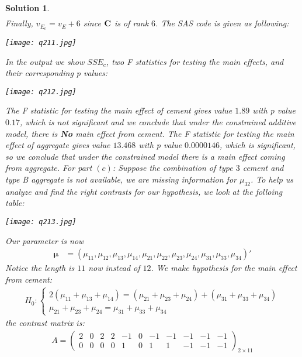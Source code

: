 \documentclass[11pt]{article}
\newtheorem{sol}{Solution}
\begin{document}
\begin{sol}
\begin{align*}
	\end{align*}
	Finally, $v_{E_c} = v_E + 6$ since ${\bf C}$ is of rank $6$.\vskip 2mm
	The SAS code is given as following:
	\begin{center}
		\texttt{[image: q211.jpg]}
	\end{center}
	In the output we show $SSE_c$, two F statistics for testing the main effects, and their corresponding p values:
	\begin{center}
		\texttt{[image: q212.jpg]}
	\end{center}
	The F statistic for testing the main effect of cement gives value $1.89$ with p value $0.17$, which is not significant and we conclude that under the constrained additive model, there is {\bf No} main effect from cement. The F statistic for testing the main effect of aggregate gives value $13.468 $ with p value $0.0000146$, which is significant, so we conclude that under the constrained model there is a main effect coming from aggregate.\vskip 2mm
	For part $(c)$:\vskip 2mm
	Suppose the combination of type $3$ cement and type B aggregate is not available, we are missing information for $\mu_{32}$. To help us analyze and find the right contrasts for our hypothesis, we look at the folloing table:
	\begin{center}
		\texttt{[image: q213.jpg]}
	\end{center}
	Our parameter is now
	\begin{align*}
		{\bm \mu} &= (\mu_{11}, \mu_{12}, \mu_{13}, \mu_{14}, \mu_{21}, \mu_{22}, \mu_{23}, \mu_{24}, \mu_{31}, \mu_{33}, \mu_{34})'
	\end{align*}
	Notice the length is $11$ now instead of $12$.\vskip 2mm
	We make hypothesis for the main effect from cement:
	\begin{align*}
		H_0: \left\{\begin{array}{l} 2(\mu_{11} + \mu_{13} + \mu_{14}) = (\mu_{21} + \mu_{23} + \mu_{24}) + (\mu_{31} + \mu_{33} + \mu_{34})\\ \mu_{21} + \mu_{23} + \mu_{24} = \mu_{31} + \mu_{33} + \mu_{34}\end{array}\right.
	\end{align*}
	the contrast matrix is:
	\begin{align*}
		A = \left(\begin{array}{ccccccccccc} 2&0&2&2&-1&0&-1&-1&-1&-1&-1\\ 0&0&0&0&1&0&1&1&-1&-1&-1 \end{array}\right)_{2 \times 11}
	\end{align*}

\end{sol}
\end{document}
